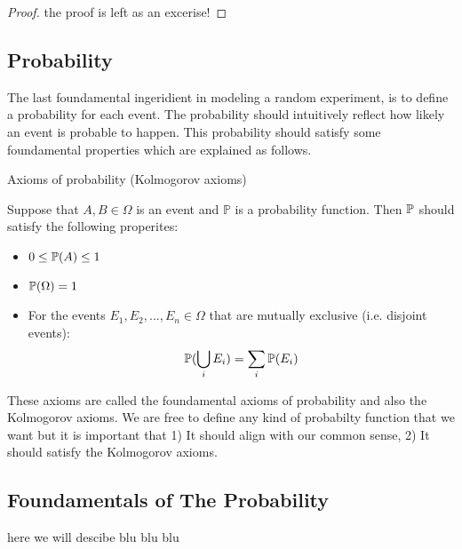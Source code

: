 \begin{proof}
the proof is left as an excerise!
\end{proof}


\subsection{Probability}

The last foundamental ingeridient in modeling a random experiment, is to define a probability for each event. The probability should intuitively reflect how likely an event is probable to happen. This probability should satisfy some foundamental properties which are explained as follows.

 \begin{axiombox}{Axioms of probability (Kolmogorov axioms)}

Suppose that $A, B \in \Omega$ is an event and $\mathbb{P}$ is a probability function. Then $\mathbb{P}$ should satisfy the following properites:

\begin{itemize}

\item $ 0 \leq \mathbb{P}(A) \leq 1$
\item $\mathbb{P}(\Omega) = 1$
\item For the events $E_1, E_2, ..., E_n \in \Omega$ that are mutually exclusive (i.e. disjoint events): $$\mathbb{P}(\bigcup_{i} E_i) = \sum_i \mathbb{P}(E_i)$$
\end{itemize}


\end{axiombox}



These axioms are called the foundamental axioms of probability and also the Kolmogorov axioms. We are free to define any kind of probabilty function that we want but it is important that 1) It should align with our common sense, 2) It should satisfy the Kolmogorov axioms. 


\subsection{Foundamentals of The Probability}

here we will descibe blu blu blu


